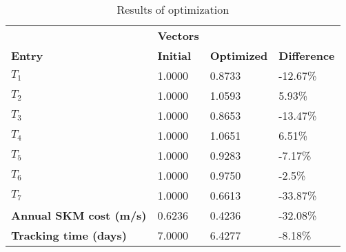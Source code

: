 \begin{table}[H]
\centering
\begin{tabular}{llll}
\textbf{}      & \cellcolor[HTML]{EFEFEF}\textbf{Vectors} & \textbf{} & \textbf{}         \\
\rowcolor[HTML]{EFEFEF} 
\textbf{Entry} & \textbf{Initial} & \textbf{Optimized} & \textbf{Difference} \\
$T_1$ & 1.0000 & 0.8733 & -12.67\% \\ 
$T_2$ & 1.0000 & 1.0593 & 5.93\% \\ 
$T_3$ & 1.0000 & 0.8653 & -13.47\% \\ 
$T_4$ & 1.0000 & 1.0651 & 6.51\% \\ 
$T_5$ & 1.0000 & 0.9283 & -7.17\% \\ 
$T_6$ & 1.0000 & 0.9750 & -2.5\% \\ 
$T_7$ & 1.0000 & 0.6613 & -33.87\% \\ 
\rowcolor[HTML]{EFEFEF} 
\textbf{Annual SKM cost (m/s)}  & 0.6236 & 0.4236 & -32.08\% \\ 
\rowcolor[HTML]{EFEFEF} 
\textbf{Tracking time (days)}  & 7.0000 & 6.4277 & -8.18\% \\ 
\end{tabular}
\caption{Results of optimization}
\label{tab:OptimizationAnalysis}
\end{table}